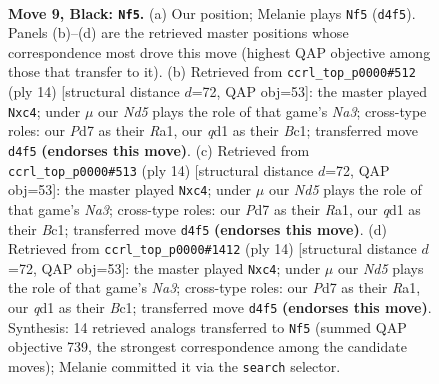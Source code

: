 \documentclass[11pt]{article}
\begin{document}
\clearpage

\begin{figure}[p]\centering
\begin{subfigure}{0.46\textwidth}\centering
\resizebox{\linewidth}{!}{%
\newchessgame
\chessboard[
  setfen={r1bq1r1k/pp1pppbp/5np1/2p5/2Pn4/2N3P1/PP1PPPBP/R1BQNRK1 b - - 9 9},
  showmover=false,
  pgfstyle=straightmove, color=movearrow, markmove={d4-f5}
]}
\caption{}
\end{subfigure}\hfill
\begin{subfigure}{0.46\textwidth}\centering
\resizebox{\linewidth}{!}{%
\newchessgame
\chessboard[
  setfen={r1bq1rk1/ppp1ppbp/2n2np1/8/2pP4/N4NP1/PP2PPBP/R1BQ1RK1 w - - 2 8},
  showmover=false,
  pgfstyle=straightmove, color=movearrow, markmove={a3-c4}
]}
\caption{}
\end{subfigure}
\\[4pt]
\begin{subfigure}{0.46\textwidth}\centering
\resizebox{\linewidth}{!}{%
\newchessgame
\chessboard[
  setfen={r1bq1rk1/ppp1ppbp/2n2np1/8/2pP4/N4NP1/PP2PPBP/R1BQ1RK1 w - - 2 8},
  showmover=false,
  pgfstyle=straightmove, color=movearrow, markmove={a3-c4}
]}
\caption{}
\end{subfigure}\hfill
\begin{subfigure}{0.46\textwidth}\centering
\resizebox{\linewidth}{!}{%
\newchessgame
\chessboard[
  setfen={r1bq1rk1/ppp1ppbp/2n2np1/8/2pP4/N4NP1/PP2PPBP/R1BQ1RK1 w - - 2 8},
  showmover=false,
  pgfstyle=straightmove, color=movearrow, markmove={a3-c4}
]}
\caption{}
\end{subfigure}
\caption{\textbf{Move 9, Black: \texttt{Nf5}.} (a) Our position; Melanie plays \texttt{Nf5} (\texttt{d4f5}). Panels (b)--(d) are the retrieved master positions whose correspondence most drove this move (highest QAP objective among those that transfer to it). (b) Retrieved from \texttt{ccrl\_top\_p0000\#512} (ply 14) [structural distance $d$=72, QAP obj=53]: the master played \texttt{Nxc4}; under $\mu$ our \emph{Nd5} plays the role of that game's \emph{Na3}; cross-type roles: our \emph{P}d7 as their \emph{R}a1, our \emph{q}d1 as their \emph{B}c1; transferred move \texttt{d4f5} \textbf{(endorses this move)}. (c) Retrieved from \texttt{ccrl\_top\_p0000\#513} (ply 14) [structural distance $d$=72, QAP obj=53]: the master played \texttt{Nxc4}; under $\mu$ our \emph{Nd5} plays the role of that game's \emph{Na3}; cross-type roles: our \emph{P}d7 as their \emph{R}a1, our \emph{q}d1 as their \emph{B}c1; transferred move \texttt{d4f5} \textbf{(endorses this move)}. (d) Retrieved from \texttt{ccrl\_top\_p0000\#1412} (ply 14) [structural distance $d$=72, QAP obj=53]: the master played \texttt{Nxc4}; under $\mu$ our \emph{Nd5} plays the role of that game's \emph{Na3}; cross-type roles: our \emph{P}d7 as their \emph{R}a1, our \emph{q}d1 as their \emph{B}c1; transferred move \texttt{d4f5} \textbf{(endorses this move)}. Synthesis: 14 retrieved analogs transferred to \texttt{Nf5} (summed QAP objective 739, the strongest correspondence among the candidate moves); Melanie committed it via the \texttt{search} selector.}
\label{fig:thought-m17}
\end{figure}
\end{document}
